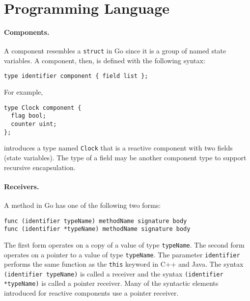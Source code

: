 
\section{Programming Language}

\paragraph{Components.}
A component resembles a \verb+struct+ in Go since it is a group of named state variables.
A component, then, is defined with the following syntax:
\begin{verbatim}
type identifier component { field list };
\end{verbatim}
For example,
\begin{verbatim}
type Clock component {
  flag bool;
  counter uint;
};
\end{verbatim}
introduces a type named \verb+Clock+ that is a reactive component with two fields (state variables).
The type of a field may be another component type to support recursive encapsulation.

\paragraph{Receivers.}
A method in Go has one of the following two forms:
\begin{verbatim}
func (identifier typeName) methodName signature body
func (identifier *typeName) methodName signature body
\end{verbatim}
The first form operates on a copy of a value of type \verb+typeName+.
The second form operates on a pointer to a value of type \verb+typeName+.
The parameter \verb+identifier+ performs the same function as the \verb+this+ keyword in C++ and Java.
The syntax \verb+(identifier typeName)+ is called a receiver and the syntax \verb+(identifier *typeName)+ is called a pointer receiver.
Many of the syntactic elements introduced for reactive components use a pointer receiver.

